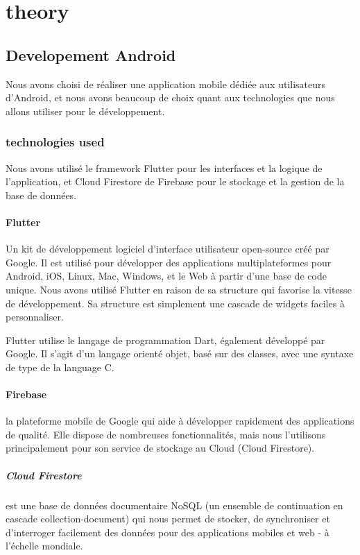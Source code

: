 \documentclass[a4paper]{report}
\begin{document}

\newpage
\chapter{theory}
	\section{Developement Android} Nous avons choisi de réaliser une application mobile dédiée aux utilisateurs d'Android, et nous avons beaucoup de choix quant aux technologies que nous allons utiliser pour le développement.
		\subsection{technologies used} Nous avons utilisé le framework Flutter pour les interfaces et la logique de l'application, et Cloud Firestore de Firebase pour le stockage et la gestion de la base de données.
		
			\subsubsection*{Flutter} Un kit de développement logiciel d'interface utilisateur open-source créé par Google. Il est utilisé pour développer des applications multiplateformes pour Android, iOS, Linux, Mac, Windows, et le Web à partir d'une base de code unique.
Nous avons utilisé Flutter en raison de sa structure qui favorise la vitesse de développement. Sa structure est simplement une cascade de widgets faciles à personnaliser.

Flutter utilise le langage de programmation Dart, également développé par Google. Il s'agit d'un langage orienté objet, basé sur des classes, avec une syntaxe de type de la language C.
			\subsubsection*{Firebase} la plateforme mobile de Google qui aide à développer rapidement des applications de qualité. Elle dispose de nombreuses fonctionnalités, mais nous l'utilisons principalement pour son service de stockage au Cloud (Cloud Firestore).
				\paragraph*{Cloud Firestore} est une base de données documentaire NoSQL (un ensemble de continuation en cascade collection-document) qui nous permet de stocker, de synchroniser et d'interroger facilement des données pour des applications mobiles et web - à l'échelle mondiale.
\end{document}
